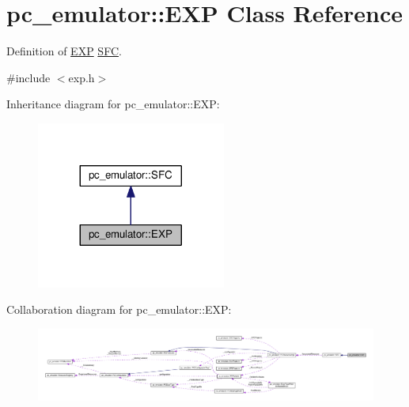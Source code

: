 \hypertarget{classpc__emulator_1_1EXP}{}\section{pc\+\_\+emulator\+:\+:E\+XP Class Reference}
\label{classpc__emulator_1_1EXP}


Definition of \hyperlink{classpc__emulator_1_1EXP}{E\+XP} \hyperlink{classpc__emulator_1_1SFC}{S\+FC}.  




{\ttfamily \#include $<$exp.\+h$>$}



Inheritance diagram for pc\+\_\+emulator\+:\+:E\+XP\+:
\nopagebreak
\begin{figure}[H]
\begin{center}
\leavevmode
\includegraphics[width=176pt]{classpc__emulator_1_1EXP__inherit__graph}
\end{center}
\end{figure}


Collaboration diagram for pc\+\_\+emulator\+:\+:E\+XP\+:
\nopagebreak
\begin{figure}[H]
\begin{center}
\leavevmode
\includegraphics[width=350pt]{classpc__emulator_1_1EXP__coll__graph}
\end{center}
\end{figure}
